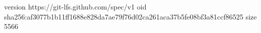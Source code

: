 version https://git-lfs.github.com/spec/v1
oid sha256:af3077b1b11ff1688e828da7ae79f76d02ca261aca37b5fe08bf3a81ccf86525
size 5566
